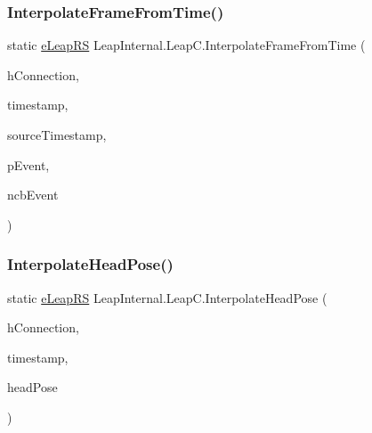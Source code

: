 \mbox{\label{class_leap_internal_1_1_leap_c_abfff5fb5bc86a2a4ddf10cdda77af006}} 
\subsubsection{\texorpdfstring{InterpolateFrameFromTime()}{InterpolateFrameFromTime()}}
{\footnotesize\ttfamily static \mbox{\hyperlink{namespace_leap_internal_ae50b07d24c508b84273392b6dcbea1d9}{e\+Leap\+RS}} Leap\+Internal.\+Leap\+C.\+Interpolate\+Frame\+From\+Time (\begin{DoxyParamCaption}\item[{Int\+Ptr}]{h\+Connection,  }\item[{Int64}]{timestamp,  }\item[{Int64}]{source\+Timestamp,  }\item[{Int\+Ptr}]{p\+Event,  }\item[{U\+Int64}]{ncb\+Event }\end{DoxyParamCaption})}

\mbox{\label{class_leap_internal_1_1_leap_c_a392940c3224b3a95959cd96789902f4c}} 
\subsubsection{\texorpdfstring{InterpolateHeadPose()}{InterpolateHeadPose()}}
{\footnotesize\ttfamily static \mbox{\hyperlink{namespace_leap_internal_ae50b07d24c508b84273392b6dcbea1d9}{e\+Leap\+RS}} Leap\+Internal.\+Leap\+C.\+Interpolate\+Head\+Pose (\begin{DoxyParamCaption}\item[{Int\+Ptr}]{h\+Connection,  }\item[{Int64}]{timestamp,  }\item[{ref \mbox{\hyperlink{struct_leap_internal_1_1_l_e_a_p___h_e_a_d___p_o_s_e___e_v_e_n_t}{L\+E\+A\+P\+\_\+\+H\+E\+A\+D\+\_\+\+P\+O\+S\+E\+\_\+\+E\+V\+E\+NT}}}]{head\+Pose }\end{DoxyParamCaption})}

\mbox{\label{class_leap_internal_1_1_leap_c_ab1e8d614352632f79ca05e23a617ceb3}} 
